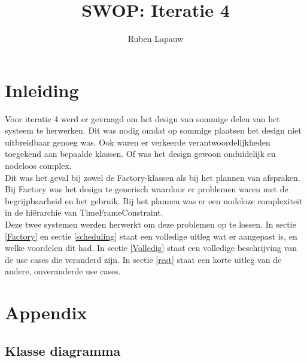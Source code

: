 \documentclass[a4paper,10pt]{article}
\title{SWOP: Iteratie 4}
\author{Ruben Lapauw}
\date{}
\begin{document}
\maketitle
 \thispagestyle{empty}
\newpage
 \thispagestyle{empty}
\tableofcontents
\newpage
\setcounter{page}{1}
\section{Inleiding}
Voor iteratie 4 werd er gevraagd om het design van sommige delen van het systeem te herwerken. 
Dit was nodig omdat op sommige plaatsen het design niet uitbreidbaar genoeg was. 
Ook waren er verkeerde verantwoordelijkheden toegekend aan bepaalde klassen. 
Of was het design gewoon onduidelijk en nodeloos complex. \\

Dit was het geval bij zowel de Factory-klassen als bij het plannen van afspraken. 
Bij Factory was het design te generisch waardoor er problemen waren met de begrijpbaarheid en het gebruik.
Bij het plannen was er een nodeloze complexiteit in de hiërarchie van TimeFrameConstraint.\\

Deze twee systemen werden herwerkt om deze problemen op te lossen. 
In sectie \ref{Factory} en sectie \ref{scheduling} staat een volledige uitleg wat er aangepast is, en welke voordelen dit had.
In sectie \ref{Volledig} staat een volledige beschrijving van de use cases die veranderd zijn.
In sectie \ref{rest} staat een korte uitleg van de andere, onveranderde use cases.



\section{Appendix}
\subsection{Klasse diagramma}
 
 
\end{document}
